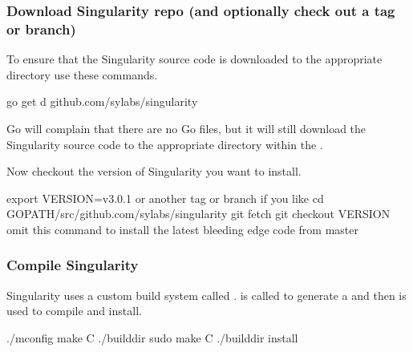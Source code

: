 \documentclass[letterpaper,10pt,english]{sphinxmanual}
\begin{document}
\subsubsection{Download Singularity repo (and optionally check out a tag or branch)}
\label{\detokenize{installation:download-singularity-repo-and-optionally-check-out-a-tag-or-branch}}
To ensure that the Singularity source code is downloaded to the appropriate
directory use these commands.

%
\begin{sphinxVerbatim}[commandchars=\\\{\}]
\PYGZdl{} go get \PYGZhy{}d github.com/sylabs/singularity
\end{sphinxVerbatim}

Go will complain that there are no Go files, but it will still  download the
Singularity source code to the appropriate directory within the .

Now checkout the version of Singularity you want to install.

%
\begin{sphinxVerbatim}[commandchars=\\\{\}]
\PYGZdl{} export VERSION=v3.0.1 \PYGZsh{} or another tag or branch if you like \PYGZam{}\PYGZam{} \PYGZbs{}
    cd \PYGZdl{}GOPATH/src/github.com/sylabs/singularity \PYGZam{}\PYGZam{} \PYGZbs{}
    git fetch \PYGZam{}\PYGZam{} \PYGZbs{}
    git checkout \PYGZdl{}VERSION \PYGZsh{} omit this command to install the latest bleeding edge code from master
\end{sphinxVerbatim}


\subsubsection{Compile Singularity}
\label{\detokenize{installation:compile-singularity}}
Singularity uses a custom build system called .   is called
to generate a  and then  is used to compile and install.

%
\begin{sphinxVerbatim}[commandchars=\\\{\}]
\PYGZdl{} ./mconfig \PYGZam{}\PYGZam{} \PYGZbs{}
    make \PYGZhy{}C ./builddir \PYGZam{}\PYGZam{} \PYGZbs{}
    sudo make \PYGZhy{}C ./builddir install
\end{sphinxVerbatim}
\end{document}
